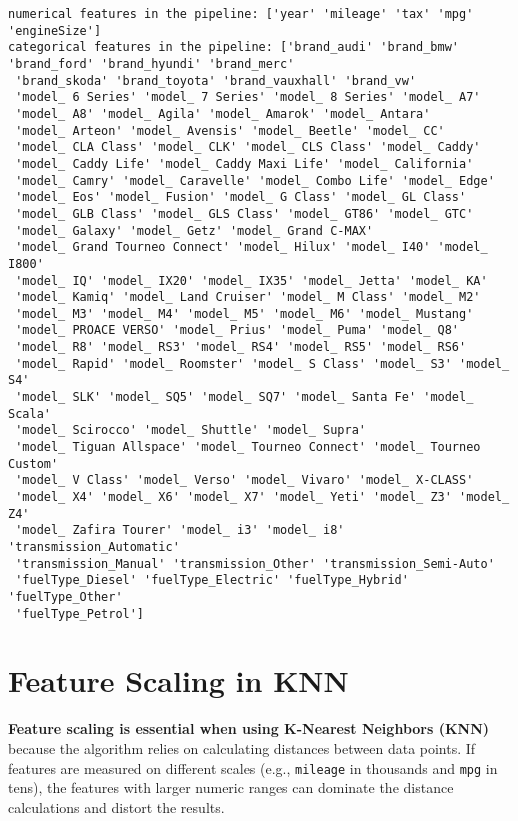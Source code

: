 \documentclass[
  letterpaper,
  DIV=11,
  numbers=noendperiod]{scrreprt}
\begin{document}
\begin{verbatim}
numerical features in the pipeline: ['year' 'mileage' 'tax' 'mpg' 'engineSize']
categorical features in the pipeline: ['brand_audi' 'brand_bmw' 'brand_ford' 'brand_hyundi' 'brand_merc'
 'brand_skoda' 'brand_toyota' 'brand_vauxhall' 'brand_vw'
 'model_ 6 Series' 'model_ 7 Series' 'model_ 8 Series' 'model_ A7'
 'model_ A8' 'model_ Agila' 'model_ Amarok' 'model_ Antara'
 'model_ Arteon' 'model_ Avensis' 'model_ Beetle' 'model_ CC'
 'model_ CLA Class' 'model_ CLK' 'model_ CLS Class' 'model_ Caddy'
 'model_ Caddy Life' 'model_ Caddy Maxi Life' 'model_ California'
 'model_ Camry' 'model_ Caravelle' 'model_ Combo Life' 'model_ Edge'
 'model_ Eos' 'model_ Fusion' 'model_ G Class' 'model_ GL Class'
 'model_ GLB Class' 'model_ GLS Class' 'model_ GT86' 'model_ GTC'
 'model_ Galaxy' 'model_ Getz' 'model_ Grand C-MAX'
 'model_ Grand Tourneo Connect' 'model_ Hilux' 'model_ I40' 'model_ I800'
 'model_ IQ' 'model_ IX20' 'model_ IX35' 'model_ Jetta' 'model_ KA'
 'model_ Kamiq' 'model_ Land Cruiser' 'model_ M Class' 'model_ M2'
 'model_ M3' 'model_ M4' 'model_ M5' 'model_ M6' 'model_ Mustang'
 'model_ PROACE VERSO' 'model_ Prius' 'model_ Puma' 'model_ Q8'
 'model_ R8' 'model_ RS3' 'model_ RS4' 'model_ RS5' 'model_ RS6'
 'model_ Rapid' 'model_ Roomster' 'model_ S Class' 'model_ S3' 'model_ S4'
 'model_ SLK' 'model_ SQ5' 'model_ SQ7' 'model_ Santa Fe' 'model_ Scala'
 'model_ Scirocco' 'model_ Shuttle' 'model_ Supra'
 'model_ Tiguan Allspace' 'model_ Tourneo Connect' 'model_ Tourneo Custom'
 'model_ V Class' 'model_ Verso' 'model_ Vivaro' 'model_ X-CLASS'
 'model_ X4' 'model_ X6' 'model_ X7' 'model_ Yeti' 'model_ Z3' 'model_ Z4'
 'model_ Zafira Tourer' 'model_ i3' 'model_ i8' 'transmission_Automatic'
 'transmission_Manual' 'transmission_Other' 'transmission_Semi-Auto'
 'fuelType_Diesel' 'fuelType_Electric' 'fuelType_Hybrid' 'fuelType_Other'
 'fuelType_Petrol']
\end{verbatim}

\section{Feature Scaling in KNN}\label{feature-scaling-in-knn}

\textbf{Feature scaling is essential when using K-Nearest Neighbors
(KNN)} because the algorithm relies on calculating distances between
data points. If features are measured on different scales (e.g.,
\texttt{mileage} in thousands and \texttt{mpg} in tens), the features
with larger numeric ranges can dominate the distance calculations and
distort the results.
\end{document}
